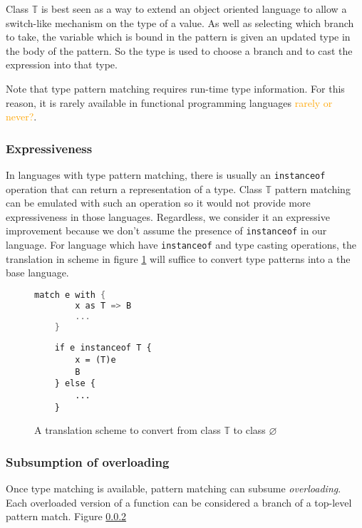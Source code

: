 \documentclass[acmsmall]{acmart}
\renewcommand\todo[1]{\textcolor{orange}{#1}}
\begin{document}
Class $\mathbb{T}$ is best seen as a way to extend an object oriented language to allow a switch-like mechanism on the type of a value.  As well as selecting which branch to take, the variable which is bound in the pattern is given an updated type in the body of the pattern.  So the type is used to choose a branch and to cast the expression into that type.

Note that type pattern matching requires run-time type information.  For this reason, it is rarely available in functional programming languages \todo{rarely or never?}.

\subsubsection{Expressiveness}

In languages with type pattern matching, there is usually an \lstinline{instanceof} operation that can return a representation of a type.  Class $\mathbb{T}$ pattern matching can be emulated with such an operation so it would not provide more expressiveness in those languages.  Regardless, we consider it an expressive improvement because we don't assume the presence of \lstinline{instanceof} in our language.  For language which have \lstinline{instanceof} and type casting operations, the translation in scheme in figure \ref{trans:type} will suffice to convert type patterns into a the base language.

\begin{figure}
    \begin{minipage}[t]{0.4\linewidth}
    \begin{lstlisting}[language=C]
    match e with {
        x as T => B
        ...
    }
    \end{lstlisting}
    \end{minipage}
    \begin{minipage}[t]{0.4\linewidth}
    \begin{lstlisting}
    if e instanceof T {
        x = (T)e
        B
    } else {
        ...
    }
    \end{lstlisting}
    \end{minipage}
    \caption{A translation scheme to convert from class $\mathbb{T}$ to class $\varnothing$}
    \label{trans:type}
    \end{figure}
        

\subsubsection{Subsumption of overloading}
Once type matching is available, pattern matching can subsume \emph{overloading}.  Each overloaded version of a function can be considered a branch of a top-level pattern match.  Figure \ref{}
\end{document}
